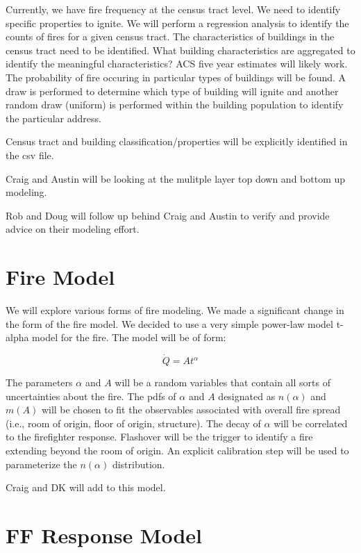 \documentclass[11pt]{article} %
\begin{document}
Currently, we have fire frequency at the census tract level.  We need to identify specific properties to ignite.  We will perform a regression analysis to identify the counts of fires for a given census tract.  The characteristics of buildings in the census tract need to be identified. What building characteristics are aggregated to identify the meaningful characteristics?  ACS five year estimates will likely work.  The probability of fire occuring in particular types of buildings will be found.  A draw is performed to determine which type of building will ignite and another random draw (uniform) is performed within the building population to identify the particular address.  

Census tract and building classification/properties will be explicitly identified in the csv file.  

Craig and Austin will be looking at the mulitple layer top down and bottom up modeling.

Rob and Doug will follow up behind Craig and Austin to verify and provide advice on their modeling effort.

\section{Fire Model}

We will explore various forms of fire modeling. We made a significant change in the form of the fire model.  We decided to use a very simple power-law model  t-alpha model for the fire.  The model will be of form:

\begin{equation}
\dot{Q}=At^{\alpha}
\label{eq_qdot}
\end{equation} 

The parameters $\alpha$  and $A$  will be a random variables that contain all sorts of uncertainties about the fire. The pdfs of $\alpha$ and $A$ designated as $n(\alpha)$ and $m(A)$ will be chosen to fit the observables associated with overall fire spread (i.e., room of origin, floor of origin, structure).    The decay of $\alpha$ will be correlated to the firefighter response.  Flashover will be the trigger to identify a fire extending beyond the room of origin.  An explicit calibration step will be used to parameterize the $n(\alpha)$ distribution.

Craig and DK will add to this model.


\section{FF Response Model}
\end{document}
